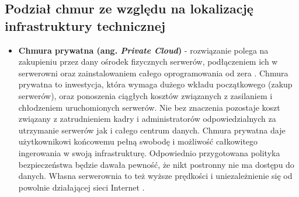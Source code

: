 \documentclass[10pt,a4paper,titlepage,twoside]{report}
\begin{document}
\subsection{Podział chmur ze względu na lokalizację infrastruktury technicznej}
\begin{itemize}
	\item \textbf{Chmura prywatna (ang. \textit{Private Cloud})} - rozwiązanie polega na zakupieniu przez dany ośrodek fizycznych serwerów, podłączeniem ich w serwerowni oraz zainstalowaniem całego oprogramowania od zera \cite{ad10}. Chmura prywatna to inwestycja, która wymaga dużego wkładu początkowego (zakup serwerów), oraz ponoszenia ciągłych kosztów związanych z zasilaniem i chłodzeniem uruchomionych serwerów. Nie bez znaczenia pozostaje koszt związany z zatrudnieniem kadry i administratorów odpowiedzialnych za utrzymanie serwerów jak i całego centrum danych. Chmura prywatna daje użytkownikowi końcowemu pełną swobodę i możliwość całkowitego ingerowania w swoją infrastrukturę. Odpowiednio przygotowana polityka bezpieczeństwa będzie dawała pewność, że nikt postronny nie ma dostępu do danych. Własna serwerownia to też wyższe prędkości i uniezależnienie się od powolnie działającej sieci Internet \cite{ad11}.

\end{itemize}
\end{document}
